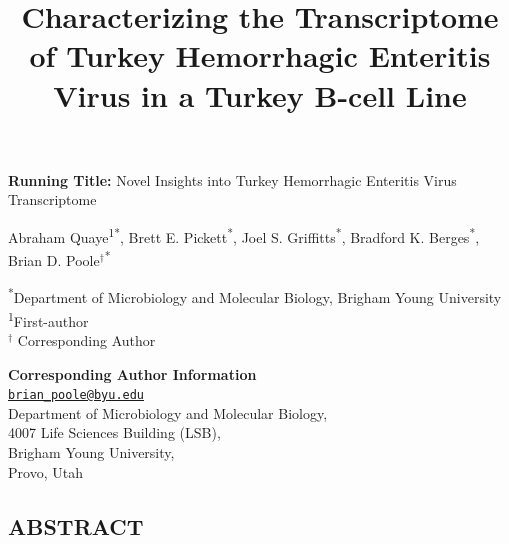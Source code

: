 \documentclass[
]{article}
\title{Characterizing the Transcriptome of Turkey Hemorrhagic Enteritis
Virus in a Turkey B-cell Line}
\author{}
\date{\vspace{-2.5em}}
\begin{document}
\maketitle

\captionsetup[table]{labelformat=empty}

\vspace{5mm}

\textbf{Running Title:} Novel Insights into Turkey Hemorrhagic Enteritis
Virus Transcriptome

\vspace{10mm}

Abraham Quaye\textsuperscript{1*}, Brett E. Pickett\textsuperscript{*},
Joel S. Griffitts\textsuperscript{*}, Bradford K.
Berges\textsuperscript{*}, Brian D.
Poole\({^\dagger}\)\textsuperscript{*}

\vspace{5mm}

\textsuperscript{*}Department of Microbiology and Molecular Biology,
Brigham Young University\\
\textsuperscript{1}First-author\\
\({^\dagger}\) Corresponding Author

\vspace{5mm}

\textbf{Corresponding Author Information}\\
\href{mailto:brian_poole@byu.edu}{\nolinkurl{brian\_poole@byu.edu}}\\
Department of Microbiology and Molecular Biology,\\
4007 Life Sciences Building (LSB),\\
Brigham Young University,\\
Provo, Utah\\
\newpage

\subsection{ABSTRACT}\label{abstract}
\end{document}
